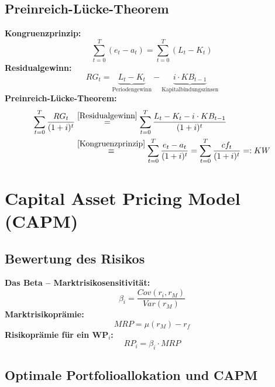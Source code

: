 \documentclass[leqno]{scrartcl}
\begin{document}
\begin{multicols}{3}
\subsection{Preinreich-Lücke-Theorem}

\textbf{Kongruenzprinzip:}
  \begin{equation}\label{Kongruenzprinzip}
    \sum^{T}_{t=0} (e_t-a_t) = \sum^{T}_{t=0} (L_t-K_t)
  \end{equation}
\textbf{Residualgewinn:}
  \begin{equation}\label{Residualgewinn}
    RG_t=\underbrace{L_t-K_t}_\text{Periodengewinn}-\underbrace{i \cdot KB_{t-1}}_\text{Kapitalbindungszinsen}
  \end{equation}
\textbf{Preinreich-Lücke-Theorem:}
  \begin{equation}
    \begin{split}
      \sum^{T}_{t=0} \frac{RG_t}{(1+i)^t} 
        &\overset{\ref{Residualgewinn}}{=} \sum^{T}_{t=0} \frac{L_t - K_t - i \cdot KB_{t-1}}{(1+i)^t}\\
        &\overset{\ref{Kongruenzprinzip}}{\equiv} \sum^{T}_{t=0} \frac{e_t - a_t}{(1+i)^t}
        = \sum^{T}_{t=0} \frac{cf_t}{(1+i)^t}
        =: KW
    \end{split}
  \end{equation}

\section{Capital Asset Pricing Model (CAPM)}

\subsection{Bewertung des Risikos}
  \textbf{Das Beta – Marktrisikosensitivität:}
    \begin{equation}
      \beta_i = \frac{Cov(r_i ,r_M)}{Var(r_M)}
    \end{equation}
  \textbf{Marktrisikoprämie:}
    \begin{equation}
      MRP = \mu(r_M) -r_f
    \end{equation}
  \textbf{Risikoprämie für ein WP$_i$:}
    \begin{equation}
      RP_i = \beta_i \cdot MRP
    \end{equation}

\subsection{Optimale Portfolioallokation und CAPM}


\end{multicols}
\end{document}
